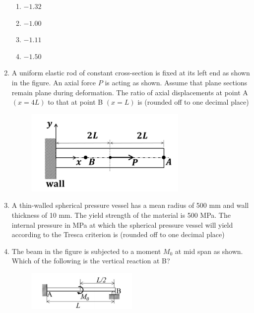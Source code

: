 \documentclass[a4paper,10pt]{article}
\begin{document}
\begin{enumerate}
\hfill{}
\begin{enumerate}
    \item $-1.32$
    \item $-1.00$
    \item $-1.11$
    \item $-1.50$
\end{enumerate}

\item A uniform elastic rod of constant cross-section is fixed at its left end as shown in the figure. An axial force $P$ is acting as shown. Assume that plane sections remain plane during deformation. The ratio of axial displacements at point A $(x=4L)$ to that at point B $(x=L)$ is \underline{\hspace{2cm}} (rounded off to one decimal place)
\begin{figure}[H]
    \centering
    \includegraphics[width=0.5\columnwidth]{q73.png}
    \caption*{}
    \label{fig:q73}
\end{figure}

\hfill{}

\item A thin-walled spherical pressure vessel has a mean radius of 500 mm and wall thickness of 10 mm. The yield strength of the material is 500 MPa. The internal pressure in MPa at which the spherical pressure vessel will yield according to the Tresca criterion is \underline{\hspace{2cm}} (rounded off to one decimal place)

\hfill{}

\item The beam in the figure is subjected to a moment $M_0$ at mid span as shown. Which of the following is the vertical reaction at B?
\begin{figure}[H]
    \centering
    \includegraphics[width=0.5\columnwidth]{q75.png}
    \caption*{}
    \label{fig:q75}
\end{figure}


\end{enumerate}
\end{document}
